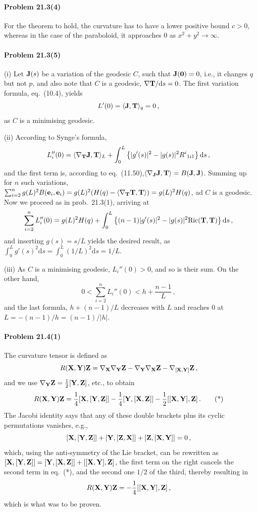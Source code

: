 \documentclass[a4paper,12pt]{article}
\def\d{\mathrm{d}}
\newcommand{\problem}[1]{\paragraph{Problem #1}}
\begin{document}

\problem{21.3(4)} For the theorem to hold, the curvature has to have a lower positive bound $c>0$, whereas in the case of the paraboloid, it approaches 0 as $x^2+y^2\to \infty$.


\problem{21.3(5)} (i) Let ${\bf J}(s)$ be a variation of the geodesic $C$, such that ${\bf J(0)}=0$, i.e., it changes $q$ but not $p$, and also note that $C$ is a geodesic, $\nabla {\bf T}/\d s=0$. The first variation formula, eq.\ (10.4), yields
\[
 L'(0) = \langle {\bf J}, {\bf T}\rangle_q =0\,,
\]
as $C$ is a minimising geodesic.

(ii) According to Synge's formula,
\[
 L_i''(0) = \langle \nabla_{\bf T}{\bf J}, {\bf T}\rangle_L + \int_0^L \left\{ |g'(s)|^2 -|g(s)|^2  R^i{}_{1i1}\right\}\d s\,,
\]
and the first term is, according to eq.\ (11.50),$ \langle \nabla_{\bf J}{\bf J}, {\bf T}\rangle = B({\bf J},{\bf J})$. Summing up for $n$ such variations, $\sum_{i=2}^n g(L)^2 B({\bf e}_i, {\bf e}_i) = g(L)^2 (H(q) - \langle \nabla_{\bf T}{\bf T}, {\bf T}\rangle) = g(L)^2 H(q)$, ad $C$ is a geodesic. Now we proceed as in prob.\ 21.3(1), arriving at
\[
 \sum_{i=2}^n L_i''(0) = g(L)^2 H(q) + \int_0^L \left\{ (n-1) |g'(s)|^2 - |g(s)|^2 {\rm Ric}({\bf T}, {\bf T})\right\} \d s\,,
\]
and inserting $g(s)=s/L$ yields the desired result, as $\int_0^L g'(s)^2\d s = \int_0^L (1/L)^2 \d s = 1/L$.

(iii) As $C$ is a minimising geodesic, $L_i''(0)>0$, and so is their sum. On the other hand,
\[
 0 < \sum_{i=2}^n L_i''(0) < h + \frac{n-1}{L}\,,
\]
and the last formula, $h+(n-1)/L$ decreases with $L$ and reaches 0 at $L=-(n-1)/h = (n-1)/|h|$.


\problem{21.4(1)} The curvature tensor is defined as
\[
 R({\bf X}, {\bf Y}){\bf Z} = \nabla_{\bf X}\nabla_{\bf Y}{\bf Z} - \nabla_{\bf Y}\nabla_{\bf X}{\bf Z}-\nabla_{[{\bf X}, {\bf Y}]}{\bf Z}\,,
\]
and we use $\nabla_{\bf Y} {\bf Z} = \frac{1}{2}[{\bf Y}, {\bf Z}]$, etc., to obtain
\[
 R({\bf X}, {\bf Y}){\bf Z} = \frac{1}{4}[{\bf X},[{\bf Y}, {\bf Z}]]-\frac{1}{4}[{\bf Y}, [{\bf X}, {\bf Z}]]-\frac{1}{2}[[{\bf X}, {\bf Y}],{\bf Z}]\,.\tag{*}
\]
The Jacobi identity says that any of these double brackets plus its cyclic permutations vanishes, e.g.,
\[
 [{\bf X}, [{\bf Y}, {\bf Z}]] + [{\bf Y}, [{\bf Z}, {\bf X}]] + [{\bf Z}, [{\bf X}, {\bf Y}]] = 0\,,
\]
which, using the anti-symmetry of the Lie bracket, can be rewritten as $[{\bf X}, [{\bf Y}, {\bf Z}]] = [{\bf Y}, [{\bf X}, {\bf Z}]]+[[{\bf X}, {\bf Y}], {\bf Z}]$, the first term on the right cancels the second term in eq.\ (*), and the second one $1/2$ of the third, thereby resulting in
\[
 R({\bf X}, {\bf Y}){\bf Z} = -\frac{1}{4}[[{\bf X}, {\bf Y}],{\bf Z}]\,,
\]
which is what was to be proven.
\end{document}
